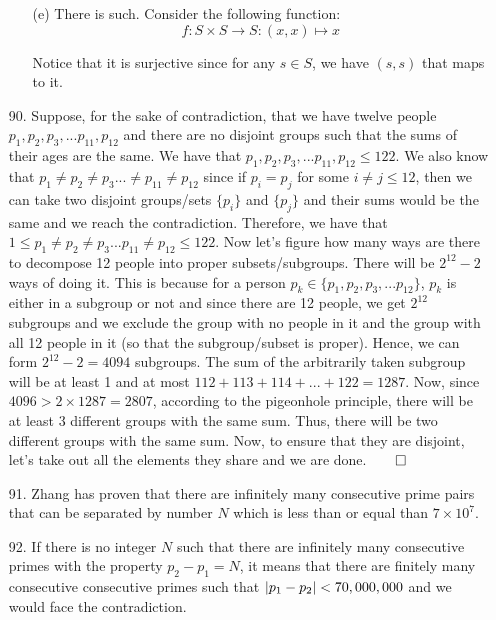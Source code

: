 \documentclass[12pt, a4paper]{article}
\DeclarePairedDelimiter\abs{\lvert}{\rvert}
\newcommand{\rarr}{\rightarrow}
\begin{document}
\begin{itemize}
\begin{itemize}
\item[(e)]
There is such. Consider the following function:
$$f : S \times S \rarr S : (x, x) \mapsto x$$

Notice that it is surjective since for any $s \in S$, we have
$(s, s)$ that maps to it.
\end{itemize}

\newpage

\item[90.]
Suppose, for the sake of contradiction, that we have twelve people $p_1, p_2, p_3, ... p_{11}, p_{12}$ and
there are no disjoint groups such that the sums of their ages are the same. 
We have that $p_1, p_2, p_3, ... p_{11}, p_{12} \leq 122$. We also know that
$p_1 \neq p_2 \neq p_3 ... \neq p_{11} \neq p_{12}$ since if $p_i = p_j$ for some $i \neq j \leq 12$,
then we can take two disjoint groups/sets $\{p_i\}$ and $\{p_j\}$ and their sums would be the same and we reach the contradiction.
Therefore, we have that $1 \leq p_1 \neq p_2 \neq p_3 ... p_{11} \neq p_{12} \leq 122$. Now let's figure
how many ways are there to decompose 12 people into proper subsets/subgroups. There will be $2^{12} - 2$ ways of doing it.
This is because for a person $p_k \in \{p_1, p_2, p_3, ... p_12\}$, $p_k$ is either in a subgroup or not and since there are 12 people,
we get $2^{12}$ subgroups and we exclude the group with no people in it and the group with all 12 people in it (so that the subgroup/subset is proper).
Hence, we can form $2^{12} - 2 = 4094$ subgroups. The sum of the arbitrarily taken subgroup will be at least 1 and at most $112 + 113 + 114 + ... + 122 = 1287$.
Now, since $4096 > 2 \times 1287 = 2807$, according to the pigeonhole principle, there will be at least 3 different groups with the same sum. Thus, there will be
two different groups with the same sum. Now, to ensure that they are disjoint, let's take out all the elements they share and we are done.$\qed$


\item[]
\item[]

\item[91.]
Zhang has proven that there are infinitely many consecutive prime pairs that can be separated by number $N$ which is less than or equal than $7 \times 10^7$.

\item[92.]
If there is no integer $N$ such that there are infinitely many consecutive primes with the property $p_2 - p_1 = N$,
it means that there are finitely many consecutive consecutive primes such that $\abs{p_1 - p_2} < 70, 000, 000$ and
we would face the contradiction.
\end{itemize}
\end{document}
